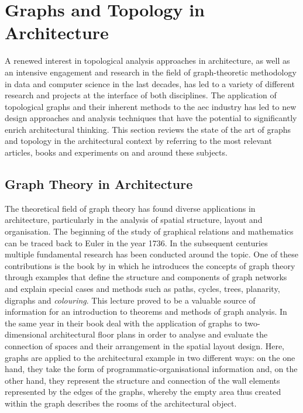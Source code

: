 \documentclass[a4paper, 12pt]{report}
\begin{document}
\section{Graphs and Topology in Architecture}\label{sec:graphs-and-topology-in-architecture}

A renewed interest in topological analysis approaches in architecture, as well as an intensive engagement and research in the field of graph-theoretic methodology in data and computer science in the last decades, has led to a variety of different research and projects at the interface of both disciplines. The application of topological graphs and their inherent methods to the \acrshort{aec} industry has led to new design approaches and analysis techniques that have the potential to significantly enrich architectural thinking. This section reviews the state of the art of graphs and topology in the architectural context by referring to the most relevant articles, books and experiments on and around these subjects.

\subsection{Graph Theory in Architecture}\label{subsec:graph-theory-in-architecture}

The theoretical field of graph theory has found diverse applications in architecture, particularly in the analysis of spatial structure, layout and organisation. The beginning of the study of graphical relations and mathematics can be traced back to Euler in the year 1736. In the subsequent centuries multiple fundamental research has been conducted around the topic. One of these contributions is the book  by \citeauthor{wilson1979introduction} in which he introduces the concepts of graph theory through examples that define the structure and components of graph networks and explain special cases and methods such as paths, cycles, trees, planarity, digraphs and \textit{colouring}. This lecture proved to be a valuable source of information for an introduction to theorems and methods of graph analysis. In the same year \citeauthor{earl1979architectural} in their book  deal with the application of graphs to two-dimensional architectural floor plans in order to analyse and evaluate the connection of spaces and their arrangement in the spatial layout design. Here, graphs are applied to the architectural example in two different ways: on the one hand, they take the form of programmatic-organisational information and, on the other hand, they represent the structure and connection of the wall elements represented by the edges of the graphs, whereby the empty area thus created within the graph describes the rooms of the architectural object.
\end{document}
